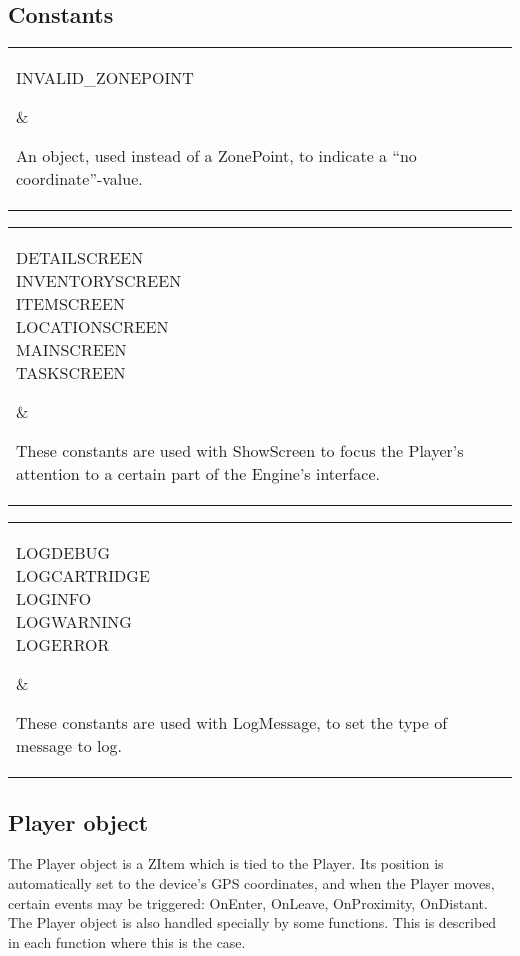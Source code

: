 \documentclass{article}
\begin{document}
\newcommand\codedef[2]{\par\noindent\begin{tabular}{|l|l|}\hline\parbox{.4\textwidth}{#1}&\parbox{.5\textwidth}{#2}\\\hline\end{tabular}\par}
\newcommand\funcdef[4]{
	\par\vskip.5\baselineskip
	\par\noindent\textbf{Function:} #1 $\rightarrow$ #2\par
	\noindent\textbf{Arguments:} \parbox{.8\textwidth}{#3}\par
	\noindent\textbf{Description:} \parbox{.8\textwidth}{#4}\par
	\vskip.5\baselineskip
}
\newcommand\attrdef[3]{
	\par\vskip.5\baselineskip
	\par\noindent\textbf{Attribute:} #1 (#2)\par
	\noindent\textbf{Description:} \parbox{.8\textwidth}{#3}\par
	\vskip.5\baselineskip
}
\subsection{Constants}
\codedef{INVALID\_ZONEPOINT}{An object, used instead of a ZonePoint, to indicate a ``no coordinate''-value.}
\codedef{DETAILSCREEN\\INVENTORYSCREEN\\ITEMSCREEN\\LOCATIONSCREEN\\MAINSCREEN\\TASKSCREEN}{These constants are used with ShowScreen to focus the Player's attention to a certain part of the Engine's interface.}
\codedef{LOGDEBUG\\LOGCARTRIDGE\\LOGINFO\\LOGWARNING\\LOGERROR}{These constants are used with LogMessage, to set the type of message to log.}

\subsection{Player object}
The Player object is a ZItem which is tied to the Player. Its position is
automatically set to the device's GPS coordinates, and when the Player moves,
certain events may be triggered: OnEnter, OnLeave, OnProximity, OnDistant. The
Player object is also handled specially by some functions. This is described in
each function where this is the case.
\end{document}
